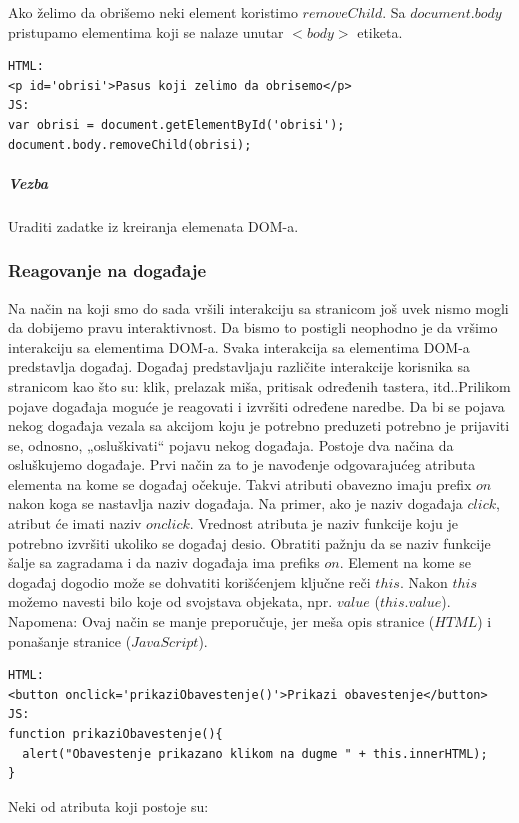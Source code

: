 \documentclass[a4paper]{article}
\begin{document}
Ako želimo da obrišemo neki element koristimo $removeChild$. Sa $document.body$ pristupamo elementima koji se nalaze unutar $<body>$ etiketa.
\begin{lstlisting}[backgroundcolor = \color{lightgray}]
HTML:
<p id='obrisi'>Pasus koji zelimo da obrisemo</p>
JS:
var obrisi = document.getElementById('obrisi');
document.body.removeChild(obrisi);
\end{lstlisting}
\subparagraph{Vezba} Uraditi zadatke iz kreiranja elemenata DOM-a.

\subsubsection{Reagovanje na događaje}
Na način na koji smo do sada vršili interakciju sa stranicom još uvek nismo mogli da dobijemo pravu interaktivnost. Da bismo to postigli neophodno je da vršimo interakciju sa elementima DOM-a.
Svaka interakcija sa elementima DOM-a predstavlja događaj. Događaj predstavljaju različite interakcije korisnika sa stranicom kao što su: klik, prelazak miša, pritisak određenih tastera, itd..Prilikom pojave događaja moguće je reagovati i izvršiti određene naredbe. Da bi se pojava nekog događaja vezala sa akcijom koju je potrebno preduzeti potrebno je prijaviti se, odnosno, „osluškivati“ pojavu nekog događaja.  Postoje dva načina da osluškujemo događaje. Prvi način za to je navođenje odgovarajućeg atributa elementa na kome se događaj očekuje. Takvi atributi obavezno imaju prefix $on$ nakon koga se nastavlja naziv događaja. Na primer, ako je naziv događaja $click$, atribut će imati naziv $onclick$. Vrednost atributa je naziv funkcije koju je potrebno izvršiti ukoliko se događaj desio. Obratiti pažnju da se naziv funkcije šalje sa zagradama i da naziv događaja ima prefiks $on$. Element na kome se događaj dogodio može se dohvatiti korišćenjem ključne reči $this$. Nakon $this$ možemo navesti bilo koje od svojstava objekata, npr. $value$ ($this.value$). Napomena: Ovaj način se manje preporučuje, jer meša opis stranice ($HTML$) i ponašanje stranice ($JavaScript$). 
\begin{lstlisting}[backgroundcolor = \color{lightgray}]
HTML:
<button onclick='prikaziObavestenje()'>Prikazi obavestenje</button>
JS:
function prikaziObavestenje(){
  alert("Obavestenje prikazano klikom na dugme " + this.innerHTML);
}
\end{lstlisting}
Neki od atributa koji postoje su: 
\end{document}
